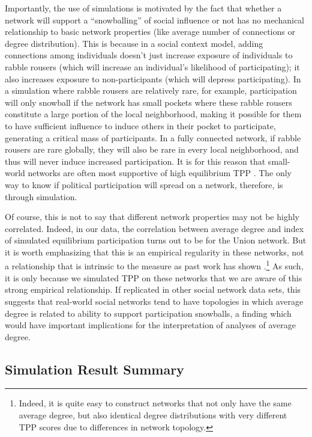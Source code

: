 \documentclass[12pt]{article}
\begin{document}
Importantly, the use of simulations is motivated by the fact that whether a network will support a ``snowballing'' of social influence or not has no mechanical relationship to basic network properties (like average number of connections or degree distribution). This is because in a social context model, adding connections among individuals doesn't just increase exposure of individuals to rabble rousers (which will increase an individual's likelihood of participating); it also increases exposure to non-participants (which will depress participating). In a simulation where rabble rousers are relatively rare, for example, participation will only snowball if the network has small pockets where these rabble rousers constitute a large portion of the local neighborhood, making it possible for them to have sufficient influence to induce others in their pocket to participate, generating a critical mass of participants. In a fully connected network, if rabble rousers are rare globally, they will also be rare in every local neighborhood, and thus will never induce increased participation. It is for this reason that small-world networks are often most supportive of high equilibrium TPP \cite{Siegel:2009vi}. The only way to know if political participation will spread on a network, therefore, is through simulation.

Of course, this is not to say that different network properties may not be highly correlated. Indeed, in our data, the correlation between average degree and index of simulated equilibrium participation turns out to be  for the Union network. But it is worth emphasizing that this is an empirical regularity in these networks, not a relationship that is intrinsic to the measure as past work has shown \citep{Siegel:2009vi}.\footnote{Indeed, it is quite easy to construct networks that not only have the same average degree, but also identical degree distributions with very different TPP scores due to differences in network topology.} As such, it is only because we simulated TPP on these networks that we are aware of this strong empirical relationship. If replicated in other social network data sets, this suggests that real-world social networks tend to have topologies in which average degree is related to ability to support participation snowballs, a finding which would have important implications for the interpretation of analyses of average degree.

\subsection{Simulation Result Summary}
\end{document}
